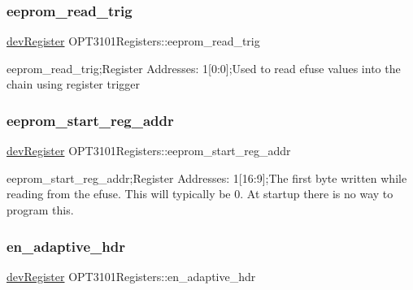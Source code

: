 \mbox{\label{class_o_p_t3101_registers_a072337c0bda7e96a2e7671c24b9d2ea0}} 
\subsubsection{\texorpdfstring{eeprom\+\_\+read\+\_\+trig}{eeprom\_read\_trig}}
{\footnotesize\ttfamily \mbox{\hyperlink{classdev_register}{dev\+Register}} O\+P\+T3101\+Registers\+::eeprom\+\_\+read\+\_\+trig}



eeprom\+\_\+read\+\_\+trig;Register Addresses\+: 1\mbox{[}0\+:0\mbox{]};Used to read efuse values into the chain using register trigger 

\mbox{\label{class_o_p_t3101_registers_a862b136ce7f6fec789152e29f6ecde14}} 
\subsubsection{\texorpdfstring{eeprom\+\_\+start\+\_\+reg\+\_\+addr}{eeprom\_start\_reg\_addr}}
{\footnotesize\ttfamily \mbox{\hyperlink{classdev_register}{dev\+Register}} O\+P\+T3101\+Registers\+::eeprom\+\_\+start\+\_\+reg\+\_\+addr}



eeprom\+\_\+start\+\_\+reg\+\_\+addr;Register Addresses\+: 1\mbox{[}16\+:9\mbox{]};The first byte written while reading from the efuse. This will typically be 0. At startup there is no way to program this. 

\mbox{\label{class_o_p_t3101_registers_a59efa795cb10c88ad0c35e64f5da5b8c}} 
\subsubsection{\texorpdfstring{en\+\_\+adaptive\+\_\+hdr}{en\_adaptive\_hdr}}
{\footnotesize\ttfamily \mbox{\hyperlink{classdev_register}{dev\+Register}} O\+P\+T3101\+Registers\+::en\+\_\+adaptive\+\_\+hdr}



